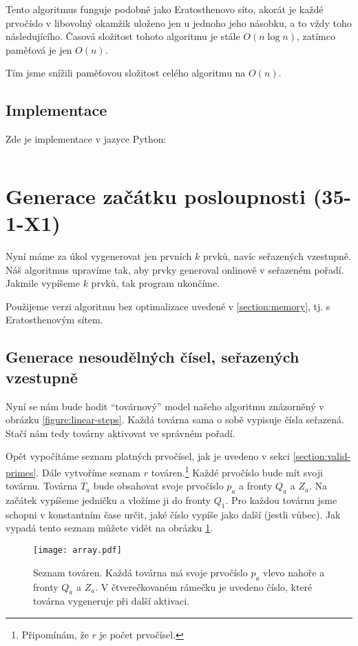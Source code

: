 \documentclass{article}
\begin{document}
Tento algoritmus funguje podobně jako Eratosthenovo síto, akorát je každé prvočíslo v libovolný okamžik uloženo jen u jednoho jeho násobku, a to vždy toho následujícího. Časová složitost tohoto algoritmu je stále $O\left(n \log{n}\right)$, zatímco paměťová je jen $O\left(n\right)$.

Tím jsme snížili paměťovou složitost celého algoritmu na $O\left(n\right)$.

\subsection{Implementace}

Zde je implementace v jazyce Python:

\inputminted{python}{code/linear.py}

\section{Generace začátku posloupnosti (35-1-X1)}

Nyní máme za úkol vygenerovat jen prvních $k$ prvků, navíc seřazených vzestupně. Náš algoritmus upravíme tak, aby prvky generoval onlinově v seřazeném pořadí. Jakmile vypíšeme $k$ prvků, tak program ukončíme.

Použijeme verzi algoritmu bez optimalizace uvedené v \ref{section:memory}, tj. s Eratosthenovým sítem.

\subsection{Generace nesoudělných čísel, seřazených vzestupně}

Nyní se nám bude hodit \enquote{továrnový} model našeho algoritmu znázorněný v obrázku \ref{figure:linear-steps}. Každá továrna sama o sobě vypisuje čísla seřazená. Stačí nám tedy továrny aktivovat ve správném pořadí.

Opět vypočítáme seznam platných prvočísel, jak je uvedeno v sekci \ref{section:valid-primes}. Dále vytvoříme seznam $r$ továren.\footnote{Připomínám, že $r$ je počet prvočísel.} Každé prvočíslo bude mít svoji továrnu. Továrna $T_a$ bude obsahovat svoje prvočíslo $p_a$ a fronty $Q_a$ a $Z_a$. Na začátek vypíšeme jedničku a vložíme ji do fronty $Q_1$. Pro každou továrnu jsme schopni v konstantním čase určit, jaké číslo vypíše jako další (jestli vůbec). Jak vypadá tento seznam můžete vidět na obrázku \ref{figure:factories}.

\begin{figure}[hp]
    \centering
    \texttt{[image: array.pdf]}
    \caption[Seznam továren]{Seznam továren. Každá továrna má svoje prvočíslo $p_a$ vlevo nahoře a fronty $Q_a$ a $Z_a$. V čtverečkovaném rámečku je uvedeno číslo, které továrna vygeneruje při další aktivaci.}
    \label{figure:factories}
\end{figure}
\end{document}
